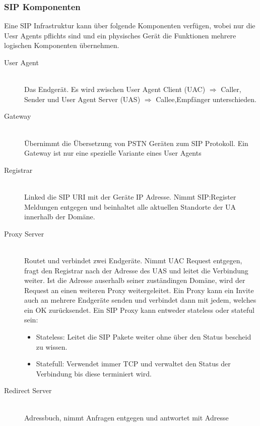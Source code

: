 \subsubsection{SIP Komponenten}
Eine SIP Infrastruktur kann über folgende Komponenten verfügen, wobei nur die Uesr Agents pflichts sind und ein physisches Gerät die Funktionen mehrere logischen Komponenten übernehmen.
\begin{description}
	\item[User Agent] \hfill \\
	Das Endgerät. Es wird zwischen User Agent Client (UAC) $\Rightarrow$ Caller, Sender und User Agent Server (UAS) $\Rightarrow$ Callee,Empfänger unterschieden.	
	\item[Gateway] \hfill \\ 
	Übernimmt die Übersetzung von PSTN Geräten zum SIP Protokoll. Ein Gateway ist nur eine spezielle Variante eines User Agents
	\item[Registrar] \hfill \\
	 Linked die SIP URI mit der Geräte IP Adresse. Nimmt SIP:Register Meldungen entgegen und beinhaltet alle aktuellen Standorte der UA innerhalb der Domäne.	
	\item[Proxy Server] \hfill \\
	Routet und verbindet zwei Endgeräte. Nimmt UAC Request entgegen, fragt den Registrar nach der Adresse des UAS und leitet die Verbindung weiter. Ist die Adresse auserhalb seiner zuständingen Domäne, wird der Request an einen weiteren Proxy weitergeleitet. Ein Proxy kann ein Invite auch an mehrere Endgeräte senden und verbindet dann mit jedem, welches ein OK zurücksendet. Ein SIP Proxy kann entweder stateless oder stateful sein:
	\begin{itemize}
		\item Stateless: Leitet die SIP Pakete weiter ohne über den Status bescheid zu wissen.
		\item Statefull: Verwendet immer TCP und verwaltet den Status der Verbindung bis diese terminiert wird.
	\end{itemize}
	\item[Redirect Server] \hfill \\
	Adressbuch, nimmt Anfragen entgegen und antwortet mit Adresse
\end{description}

